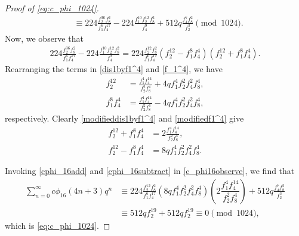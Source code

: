 \documentclass[12pt]{article}
\numberwithin{equation}{section}
\theoremstyle{plain}
\numberwithin{theorem}{section}
\theoremstyle{definition}
\theoremstyle{remark}
\begin{document}
\begin{proof}[Proof of \eqref{eq:c_phi_1024}]
\begin{align*}
			&\equiv224\frac{f_2^{36} f_8^2 }{f_1^6f_4^{17}}-224\frac{f_1^{10}f_2^{12}f_8^2}{f_4^9}+512q\frac{f_4^7 f_8^2}{f_2^{3}}\pmod{1024}.
	\end{align*}
	Now, we observe that
	\begin{align}
	224\frac{ f_2^{36} f_8^2}{f_1^6 f_4^{17}}-224\frac{ f_1^{10} f_2^{12} f_8^2}{f_4^9}=
		224\frac{ f_2^{12}  f_8^2}{f_1^6 f_4^{17}}\left(f_2^{12}-f_1^8 f_4^4\right)\left(f_2^{12}+f_1^8 f_4^4\right).\label{c_phi16observe}
	\end{align}
	Rearranging the terms in \eqref{dis1byf1^4} and \eqref{f_1^4}, we have
	\begin{align}
		f_2^{12}&=\frac{f_1^4f_4^{14}}{f_2^2f_8^4}+4qf_1^4f_2^2f_4^2f_8^4,\label{modifieddis1byf1^4}\\
		f_1^8f_4^4&=\frac{f_1^4f_4^{14}}{f_2^2f_8^4}-4qf_1^4f_2^2f_4^2f_8^4,\label{modifiedf1^4}
	\end{align} respectively. Clearly \eqref{modifieddis1byf1^4} and \eqref{modifiedf1^4} give
	\begin{align}
		f_2^{12}+f_1^8f_4^4&=2\frac{f_1^4f_4^{14}}{f_2^2f_8^4},\label{cphi_16add}\\
		f_2^{12}-f_1^8f_4^4&=8qf_1^4f_2^2f_4^2f_8^4.\label{cphi_16subtract}
	\end{align}

	Invoking \eqref{cphi_16add} and \eqref{cphi_16subtract} in \eqref{c_phi16observe}, we find that
	\begin{align*}
	\sum_{n=0}^{\infty}c\phi_{16}(4n+3)q^n&\equiv 224\frac{f_2^{12}f_8^2}{f_1^6f_4^{17}}(8qf_1^4f_2^2f_4^2f_8^4)\left(2\dfrac{f_1^4f_4^{14}}{f_2^2f_8^4}\right)+512q\frac{f_4^7 f_8^2}{f_2^{3}}\\
	&\equiv 512qf_2^{19}+512qf_2^{19}\equiv 0\pmod{1024},
\end{align*}
which is
\eqref{eq:c_phi_1024}.
\end{proof}
\end{document}
